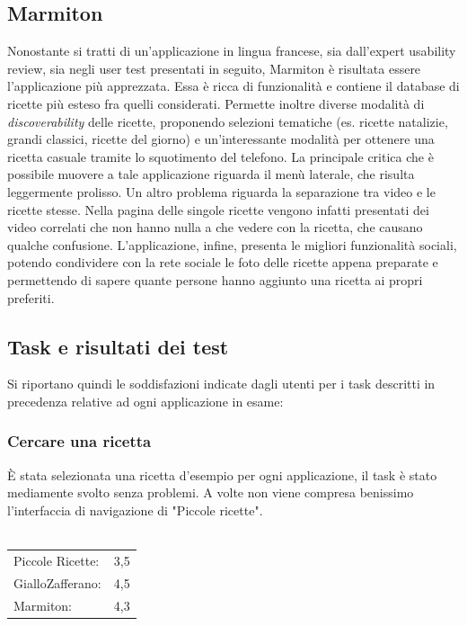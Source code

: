 \subsection{Marmiton}
Nonostante si tratti di un'applicazione in lingua francese, sia dall'expert
usability review, sia negli user test presentati in seguito, Marmiton è
risultata essere l'applicazione più apprezzata.  Essa è ricca di funzionalità e
contiene il database di ricette più esteso fra quelli considerati.  Permette
inoltre diverse modalità di \emph{discoverability} delle ricette, proponendo
selezioni tematiche (es. ricette natalizie, grandi classici, ricette del giorno)
e un'interessante modalità per ottenere una ricetta casuale tramite lo
squotimento del telefono.  La principale critica che è possibile muovere a tale
applicazione riguarda il menù laterale, che risulta leggermente prolisso. Un
altro problema riguarda la separazione tra video e le ricette stesse.  Nella
pagina delle singole ricette vengono infatti presentati dei video correlati che
non hanno nulla a che vedere con la ricetta, che causano qualche confusione.
L'applicazione, infine, presenta le migliori funzionalità sociali, potendo
condividere con la rete sociale le foto delle ricette appena preparate e
permettendo di sapere quante persone hanno aggiunto una ricetta ai propri
preferiti.



\subsection{Task e risultati dei test}
Si riportano quindi le soddisfazioni indicate dagli utenti
per i task descritti in precedenza relative ad ogni applicazione in esame:

\subsubsection{Cercare una ricetta}
È stata selezionata una ricetta d'esempio per ogni applicazione, il task è stato
mediamente svolto senza problemi.  A volte non viene compresa benissimo
l'interfaccia di navigazione di "Piccole ricette".\\\\
\begin{tabular}{l c}
Piccole Ricette: & 3,5\\
GialloZafferano: & 4,5\\
Marmiton: & 4,3\\
\end{tabular}

